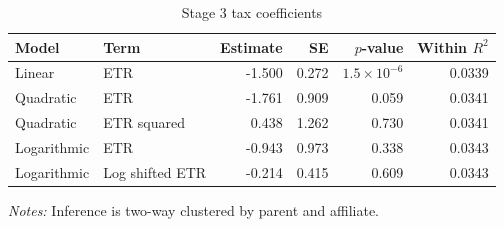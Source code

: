 \begin{table}[H]
\centering
\footnotesize
\setlength{\tabcolsep}{3pt}
\caption{Stage 3 tax coefficients}
\label{tab:app_stage3_tax_coefficients}
\begin{tabular}{@{}llrrrr@{}}
\toprule
Model & Term & Estimate & SE & $p$-value & Within $R^2$ \\
\midrule
Linear & ETR & -1.500 & 0.272 & $1.5 \times 10^{-6}$ & 0.0339 \\
Quadratic & ETR & -1.761 & 0.909 & 0.059 & 0.0341 \\
Quadratic & ETR squared &  0.438 & 1.262 & 0.730 & 0.0341 \\
Logarithmic & ETR & -0.943 & 0.973 & 0.338 & 0.0343 \\
Logarithmic & Log shifted ETR & -0.214 & 0.415 & 0.609 & 0.0343 \\
\bottomrule
\end{tabular}

\vspace{0.35em}
\noindent\begin{minipage}{\textwidth}
\footnotesize\raggedright\textit{Notes:} Inference is two-way clustered by parent and affiliate.
\end{minipage}
\end{table}
